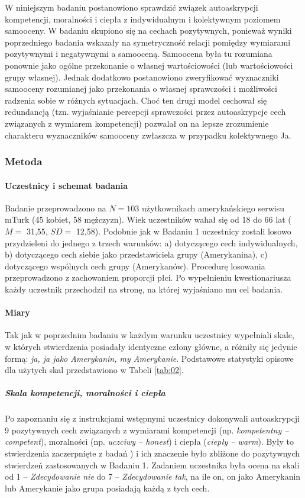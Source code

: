 \documentclass[man]{apa6}
\begin{document}
W niniejszym badaniu postanowiono sprawdzić związek autoaskrypcji kompetencji, moralności i ciepła z indywidualnym i kolektywnym poziomem samooceny. W badaniu skupiono się na cechach pozytywnych, ponieważ wyniki poprzedniego badania wskazały na symetryczność relacji pomiędzy wymiarami pozytywnymi i negatywnymi a samooceną. Samoocena była tu rozumiana ponownie jako ogólne przekonanie o własnej wartościowości (lub wartościowości grupy własnej). Jednak dodatkowo postanowiono zweryfikować wyznaczniki samooceny rozumianej jako przekonania o własnej sprawczości i możliwości radzenia sobie w różnych sytuacjach. Choć ten drugi model cechował się redundancją (tzn. wyjaśnianie percepcji sprawczości przez autoaskrypcje cech związanych z wymiarem kompetencji) pozwalał on na lepsze zrozumienie charakteru wyznaczników samooceny zwłaszcza w przypadku kolektywnego Ja.\\

\subsubsection{Metoda}

\paragraph{Uczestnicy i schemat badania}
Badanie przeprowadzono na $N=103$ użytkownikach amerykańskiego serwisu mTurk (45 kobiet, 58 mężczyzn). Wiek uczestników wahał się od 18 do 66 lat ($M=$ 31,55, $SD=$ 12,58). Podobnie jak w Badaniu 1 uczestnicy zostali losowo przydzieleni do jednego z trzech warunków: a) dotyczącego cech indywidualnych, b) dotyczącego cech siebie jako przedstawiciela grupy (Amerykanina), c) dotyczącego wspólnych cech grupy (Amerykanów). Procedurę losowania przeprowadzono z zachowaniem proporcji płci. Po wypełnieniu kwestionariusza każdy uczestnik przechodził na stronę, na której wyjaśniano mu cel badania.

\paragraph{Miary}
Tak jak w poprzednim badaniu w każdym warunku uczestnicy wypełniali skale, w których stwierdzenia posiadały identyczne człony główne, a różniły się jedynie formą: \emph{ja, ja jako Amerykanin, my Amerykanie}. Podstawowe statystyki opisowe dla użytych skal przedstawiono w Tabeli \ref{tab:02}.

\subparagraph{Skala kompetencji, moralności i ciepła}
Po zapoznaniu się z instrukcjami wstępnymi uczestnicy dokonywali autoaskrypcji 9 pozytywnych cech związanych z wymiarami kompetencji (np. \emph{kompetentny -- competent}), moralności (np. \emph{uczciwy -- honest}) i ciepła (\emph{ciepły -- warm}). Były to stwierdzenia zaczerpnięte z badań \textcite{leach2007group}) i ich znaczenie było zbliżone do pozytywnych stwierdzeń zastosowanych w Badaniu 1. Zadaniem uczestnika była ocena na skali od 1 -- \emph{Zdecydowanie nie} do 7 -- \emph{Zdecydowanie tak}, na ile on, on jako Amerykanin lub Amerykanie jako grupa posiadają każdą z tych cech. \\
\end{document}
